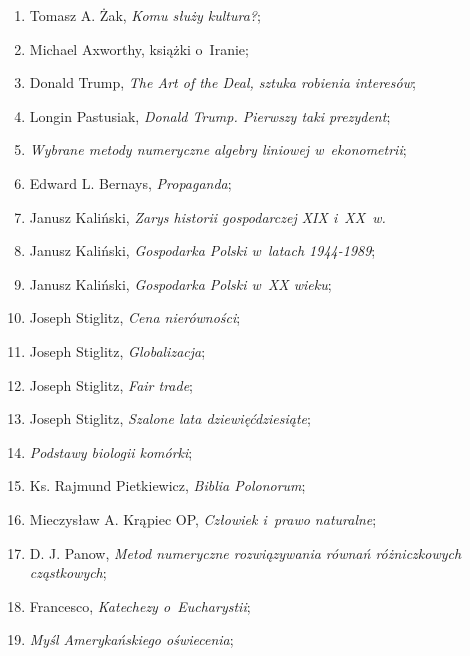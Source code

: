 \documentclass[a4paper,11pt]{article}
\begin{document}
\begin{enumerate}
\item Tomasz A. Żak, \textit{Komu służy kultura?};

\item Michael Axworthy, książki o~Iranie;

\item Donald Trump, \textit{The Art of the Deal, sztuka robienia interesów};

\item Longin Pastusiak, \textit{Donald Trump. Pierwszy taki prezydent};

\item \textit{Wybrane metody numeryczne algebry liniowej w~ekonometrii};

\item Edward L. Bernays, \textit{Propaganda};

\item Janusz Kaliński, \textit{Zarys historii gospodarczej XIX i~XX~w.}

\item Janusz Kaliński, \textit{Gospodarka Polski w~latach 1944-1989};

\item Janusz Kaliński, \textit{Gospodarka Polski w~XX wieku};

\item Joseph Stiglitz, \textit{Cena nierówności};

\item Joseph Stiglitz, \textit{Globalizacja};

\item Joseph Stiglitz, \textit{Fair trade};

\item Joseph Stiglitz, \textit{Szalone lata dziewięćdziesiąte};

\item \textit{Podstawy biologii komórki};

\item Ks. Rajmund Pietkiewicz, \textit{Biblia Polonorum};

\item Mieczysław A. Krąpiec OP, \textit{Człowiek i~prawo naturalne};

\item D. J. Panow, \textit{Metod numeryczne rozwiązywania równań
    różniczkowych cząstkowych};

\item Francesco, \textit{Katechezy o~Eucharystii};

\item \textit{Myśl Amerykańskiego oświecenia};


\end{enumerate}
\end{document}
